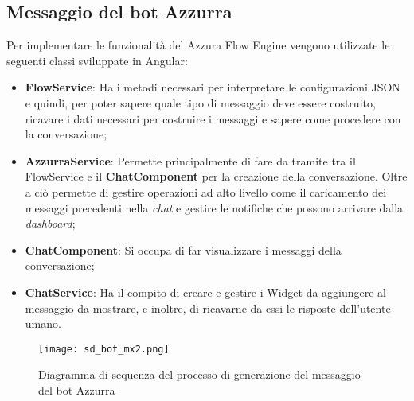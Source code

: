 \subsection{Messaggio del bot Azzurra}
Per implementare le funzionalità del Azzura Flow Engine vengono utilizzate le seguenti classi sviluppate in Angular:
\begin{itemize}
	\item \textbf{FlowService}: Ha i metodi necessari per interpretare le configurazioni JSON e quindi, per poter sapere quale tipo di messaggio deve essere costruito, ricavare i dati necessari per costruire i messaggi e sapere come procedere con la conversazione;
	\item \textbf{AzzurraService}: Permette principalmente di fare da tramite tra il FlowService e il \textbf{ChatComponent} per la creazione della conversazione. Oltre a ciò permette di gestire operazioni ad alto livello come il caricamento dei messaggi precedenti nella \emph{chat} e gestire le notifiche che possono arrivare dalla \emph{dashboard};
	\item \textbf{ChatComponent}: Si occupa di far visualizzare i messaggi della conversazione;
	\item \textbf{ChatService}: Ha il compito di creare e gestire i Widget da aggiungere al messaggio da mostrare, e inoltre, di ricavarne da essi le risposte dell'utente umano.
\end{itemize}

\begin{figure}[htbp]
	\centering
	\texttt{[image: sd\_bot\_mx2.png]}
	\caption{Diagramma di sequenza del processo di generazione del messaggio del bot Azzurra}\label{fig:mxBot}
\end{figure}

